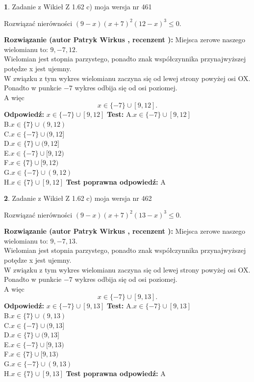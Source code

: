 \documentclass[12pt, a4paper]{article}
\theoremstyle{definition} %
\newtheorem{zad}{}
\newcommand{\zadStart}[1]{\begin{zad}#1\newline}
\newcommand{\zadStop}{\end{zad}}
\newcommand{\rozwStart}[2]{\noindent \textbf{Rozwiązanie (autor #1 , recenzent #2): }\newline}
\newcommand{\rozwStop}{\newline}
\newcommand{\odpStart}{\noindent \textbf{Odpowiedź:}\newline}
\newcommand{\odpStop}{\newline}
\newcommand{\testStart}{\noindent \textbf{Test:}\newline}
\newcommand{\testStop}{\newline}
\newcommand{\kluczStart}{\noindent \textbf{Test poprawna odpowiedź:}\newline}
\newcommand{\kluczStop}{\newline}
\begin{document}
\zadStart{Zadanie z Wikieł Z 1.62 c) moja wersja nr 461}

Rozwiązać nierówności $(9-x)(x+7)^{2}(12-x)^{3}\le0$.
\zadStop
\rozwStart{Patryk Wirkus}{}
Miejsca zerowe naszego wielomianu to: $9, -7, 12$.\\
Wielomian jest stopnia parzystego, ponadto znak współczynnika przy\linebreak najwyższej potędze x jest ujemny.\\ W związku z tym wykres wielomianu zaczyna się od lewej strony powyżej osi OX.\\
Ponadto w punkcie $-7$ wykres odbija się od osi poziomej.\\
A więc $$x \in \{-7\} \cup [9,12].$$
\rozwStop
\odpStart
$x \in \{-7\} \cup [9,12]$
\odpStop
\testStart
A.$x \in \{-7\} \cup [9,12]$\\
B.$x \in \{7\} \cup (9,12)$\\
C.$x \in \{-7\} \cup (9,12]$\\
D.$x \in \{7\} \cup (9,12]$\\
E.$x \in \{-7\} \cup [9,12)$\\
F.$x \in \{7\} \cup [9,12)$\\
G.$x \in \{-7\} \cup (9,12)$\\
H.$x \in \{7\} \cup [9,12]$
\testStop
\kluczStart
A
\kluczStop



\zadStart{Zadanie z Wikieł Z 1.62 c) moja wersja nr 462}

Rozwiązać nierówności $(9-x)(x+7)^{2}(13-x)^{3}\le0$.
\zadStop
\rozwStart{Patryk Wirkus}{}
Miejsca zerowe naszego wielomianu to: $9, -7, 13$.\\
Wielomian jest stopnia parzystego, ponadto znak współczynnika przy\linebreak najwyższej potędze x jest ujemny.\\ W związku z tym wykres wielomianu zaczyna się od lewej strony powyżej osi OX.\\
Ponadto w punkcie $-7$ wykres odbija się od osi poziomej.\\
A więc $$x \in \{-7\} \cup [9,13].$$
\rozwStop
\odpStart
$x \in \{-7\} \cup [9,13]$
\odpStop
\testStart
A.$x \in \{-7\} \cup [9,13]$\\
B.$x \in \{7\} \cup (9,13)$\\
C.$x \in \{-7\} \cup (9,13]$\\
D.$x \in \{7\} \cup (9,13]$\\
E.$x \in \{-7\} \cup [9,13)$\\
F.$x \in \{7\} \cup [9,13)$\\
G.$x \in \{-7\} \cup (9,13)$\\
H.$x \in \{7\} \cup [9,13]$
\testStop
\kluczStart
A
\kluczStop
\end{document}
